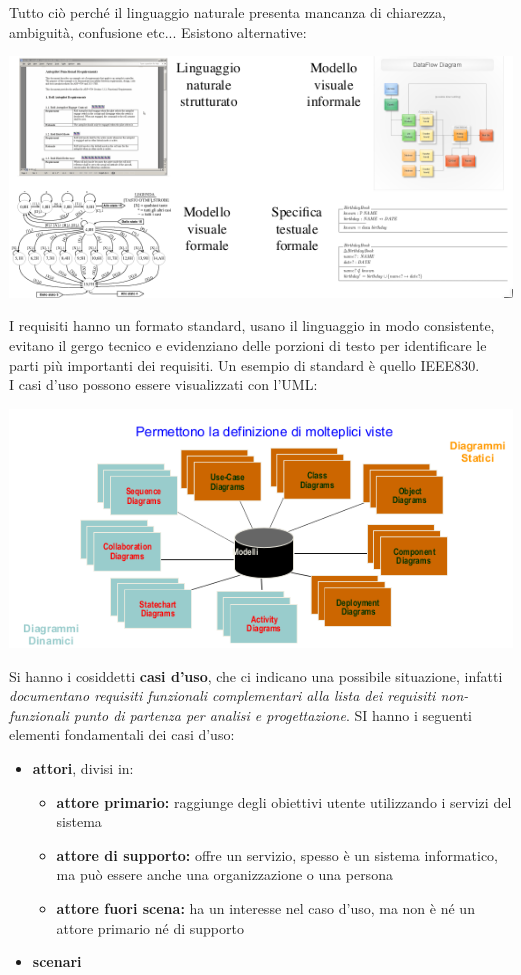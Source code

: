 \documentclass[a4paper,12pt, oneside]{book}
\begin{document}
\newpage
Tutto ciò perché il linguaggio naturale presenta mancanza di chiarezza, ambiguità, confusione etc... Esistono alternative:
\begin{center}
\includegraphics[scale=0.8]{img/req2.png}
\end{center}
I requisiti hanno un formato standard, usano il linguaggio in modo consistente, evitano il gergo tecnico e evidenziano delle porzioni di testo per identificare le parti più importanti dei requisiti. Un esempio di standard è quello IEEE830.\\
I casi d'uso possono essere visualizzati con l'UML:
\begin{center}
\includegraphics[scale=0.8]{img/uml.png}
\end{center}
Si hanno i cosiddetti \textbf{casi d'uso}, che ci indicano una possibile situazione, infatti \textit{documentano requisiti funzionali
complementari alla lista dei requisiti non-funzionali
punto di partenza per analisi e progettazione}. SI hanno i seguenti elementi fondamentali dei casi d'uso:
\begin{itemize}
\item \textbf{attori}, divisi in:
\begin{itemize}
\item \textbf{attore primario:} raggiunge degli obiettivi utente utilizzando i servizi del sistema
\item \textbf{attore di supporto:} offre un servizio, spesso è un sistema informatico, ma può essere anche una organizzazione o una persona
\item \textbf{attore fuori scena:} ha un interesse nel caso d'uso, ma non è né un attore primario né di supporto
\end{itemize}
\item \textbf{scenari}
\end{itemize}
\end{document}
